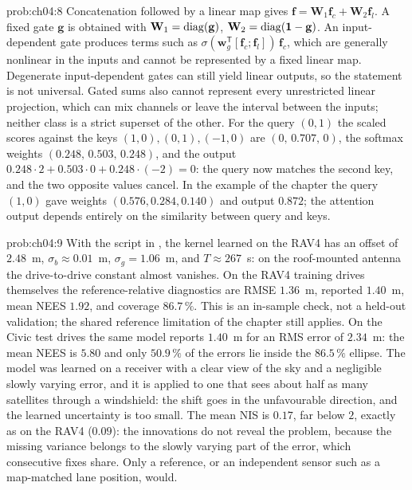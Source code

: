 \begin{sol}{prob:ch04:8}
Concatenation followed by a linear map gives $\mathbf{f}=\mathbf{W}_1\mathbf{f}_c+\mathbf{W}_2\mathbf{f}_l$. A fixed gate $\mathbf{g}$ is obtained with $\mathbf{W}_1=\operatorname{diag}(\mathbf{g})$, $\mathbf{W}_2=\operatorname{diag}(\mathbf{1}-\mathbf{g})$. An input-dependent gate produces terms such as $\sigma(\mathbf{w}_g^{\mathsf T}[\mathbf{f}_c;\mathbf{f}_l])\,\mathbf{f}_c$, which are generally nonlinear in the inputs and cannot be represented by a fixed linear map. Degenerate input-dependent gates can still yield linear outputs, so the statement is not universal. Gated sums also cannot represent every unrestricted linear projection, which can mix channels or leave the interval between the inputs; neither class is a strict superset of the other. For the query $(0,1)$ the scaled scores against the keys $(1,0),(0,1),(-1,0)$ are $(0,\,0.707,\,0)$, the softmax weights $(0.248,\,0.503,\,0.248)$, and the output $0.248\cdot2+0.503\cdot0+0.248\cdot(-2)=0$: the query now matches the second key, and the two opposite values cancel. In the example of the chapter the query $(1,0)$ gave weights $(0.576,0.284,0.140)$ and output $0.872$; the attention output depends entirely on the similarity between query and keys.
\end{sol}
\begin{sol}{prob:ch04:9}
With the script  in , the kernel learned on the RAV4 has an offset of $2.48$~m, $\sigma_b\approx0.01$~m, $\sigma_g=1.06$~m, and $T\approx267$~s: on the roof-mounted antenna the drive-to-drive constant almost vanishes. On the RAV4 training drives themselves the reference-relative diagnostics are RMSE $1.36$~m, reported $1.40$~m, mean NEES $1.92$, and coverage $86.7\,\%$. This is an in-sample check, not a held-out validation; the shared reference limitation of the chapter still applies. On the Civic test drives the same model reports $1.40$~m for an RMS error of $2.34$~m: the mean NEES is $5.80$ and only $50.9\,\%$ of the errors lie inside the $86.5\,\%$ ellipse. The model was learned on a receiver with a clear view of the sky and a negligible slowly varying error, and it is applied to one that sees about half as many satellites through a windshield: the shift goes in the unfavourable direction, and the learned uncertainty is too small. The mean NIS is $0.17$, far below $2$, exactly as on the RAV4 ($0.09$): the innovations do not reveal the problem, because the missing variance belongs to the slowly varying part of the error, which consecutive fixes share. Only a reference, or an independent sensor such as a map-matched lane position, would.
\end{sol}
